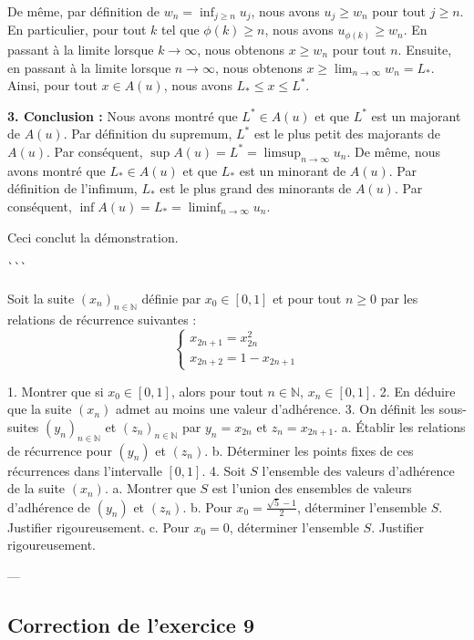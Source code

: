 \documentclass{report}
\begin{document}
De même, par définition de $w_n = \inf_{j \ge n} u_j$, nous avons $u_j \ge w_n$ pour tout $j \ge n$.
En particulier, pour tout $k$ tel que $\phi(k) \ge n$, nous avons $u_{\phi(k)} \ge w_n$.
En passant à la limite lorsque $k \to \infty$, nous obtenons $x \ge w_n$ pour tout $n$.
Ensuite, en passant à la limite lorsque $n \to \infty$, nous obtenons $x \ge \lim_{n \to \infty} w_n = L_*$.
Ainsi, pour tout $x \in A(u)$, nous avons $L_* \le x \le L^*$.

\textbf{3. Conclusion :}
Nous avons montré que $L^* \in A(u)$ et que $L^*$ est un majorant de $A(u)$. Par définition du supremum, $L^*$ est le plus petit des majorants de $A(u)$. Par conséquent, $\sup A(u) = L^* = \limsup_{n \to \infty} u_n$.
De même, nous avons montré que $L_* \in A(u)$ et que $L_*$ est un minorant de $A(u)$. Par définition de l'infimum, $L_*$ est le plus grand des minorants de $A(u)$. Par conséquent, $\inf A(u) = L_* = \liminf_{n \to \infty} u_n$.

Ceci conclut la démonstration.

\begin{lstlisting}[language=Python]
```
\end{lstlisting}

\newpage


Soit la suite $(x_n)_{n \in \mathbb{N}}$ définie par $x_0 \in [0,1]$ et pour tout $n \ge 0$ par les relations de récurrence suivantes :
$$
\begin{cases}
x_{2n+1} = x_{2n}^2 \\
x_{2n+2} = 1 - x_{2n+1}
\end{cases}
$$

1.  Montrer que si $x_0 \in [0,1]$, alors pour tout $n \in \mathbb{N}$, $x_n \in [0, 1]$.
2.  En déduire que la suite $(x_n)$ admet au moins une valeur d'adhérence.
3.  On définit les sous-suites $(y_n)_{n \in \mathbb{N}}$ et $(z_n)_{n \in \mathbb{N}}$ par $y_n = x_{2n}$ et $z_n = x_{2n+1}$.
    a.  Établir les relations de récurrence pour $(y_n)$ et $(z_n)$.
    b.  Déterminer les points fixes de ces récurrences dans l'intervalle $[0,1]$.
4.  Soit $S$ l'ensemble des valeurs d'adhérence de la suite $(x_n)$.
    a.  Montrer que $S$ est l'union des ensembles de valeurs d'adhérence de $(y_n)$ et $(z_n)$.
    b.  Pour $x_0 = \frac{\sqrt{5}-1}{2}$, déterminer l'ensemble $S$. Justifier rigoureusement.
    c.  Pour $x_0 = 0$, déterminer l'ensemble $S$. Justifier rigoureusement.

---

\subsection*{Correction de l'exercice 9}
\end{document}
